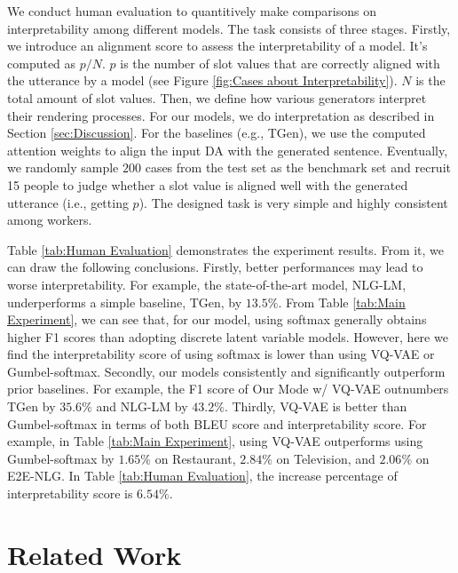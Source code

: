 \documentclass[letterpaper]{article} %
\begin{document}
	We conduct human evaluation to quantitively make comparisons on interpretability among different models. The task consists of three stages. Firstly, we introduce an alignment score to assess the interpretability of a model. It's computed as $p / N$. $p$ is the number of slot values that are correctly aligned with the utterance by a model (see Figure \ref{fig:Cases about Interpretability}). $N$ is the total amount of slot values. Then, we define how various generators interpret their rendering processes. For our models, we do interpretation as described in Section \ref{sec:Discussion}. For the baselines (e.g., TGen), we use the computed attention weights to align the input DA with the generated sentence. Eventually, we randomly sample $200$ cases from the test set as the benchmark set and recruit 15 people to judge whether a slot value is aligned well with the generated utterance (i.e., getting $p$). The designed task is very simple and highly consistent among workers.

	Table \ref{tab:Human Evaluation} demonstrates the experiment results. From it, we can draw the following conclusions. Firstly, better performances may lead to worse interpretability. For example, the state-of-the-art model, NLG-LM, underperforms a simple baseline, TGen, by $13.5\%$. From Table \ref{tab:Main Experiment}, we can see that, for our model, using softmax generally obtains higher F1 scores than adopting discrete latent variable models. However, here we find the interpretability score of using softmax is lower than using VQ-VAE or Gumbel-softmax. Secondly, our models consistently and significantly outperform prior baselines. For example, the F1 score of Our Mode w/ VQ-VAE outnumbers TGen by $35.6\%$ and NLG-LM by $43.2\%$. Thirdly, VQ-VAE is better than Gumbel-softmax in terms of both BLEU score and interpretability score. For example, in Table \ref{tab:Main Experiment}, using VQ-VAE outperforms using Gumbel-softmax by $1.65\%$ on Restaurant, $2.84\%$ on Television, and $2.06\%$ on E2E-NLG. In Table \ref{tab:Human Evaluation}, the increase percentage of interpretability score is $6.54\%$.

\section{Related Work}
\end{document}

